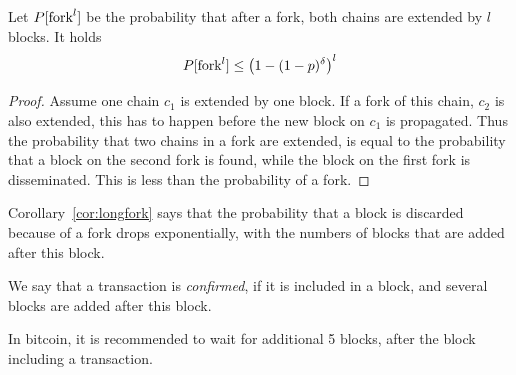 \begin{cor}
\label{cor:longfork}
Let $P[\textnormal{fork}^l]$ be the probability that after a fork, both chains are extended by $l$ blocks. It holds
	\[
		P[\textnormal{fork}^l] \leq \left(1-(1-p)^\delta\right)^l
	\]
	
\end{cor}
\begin{proof}
Assume one chain $c_1$ is extended by one block. If a fork of this chain, $c_2$ is also extended, this has to happen before the new block on $c_1$ is propagated. Thus the probability that two chains in a fork are extended, is equal to the probability that a block on the second fork is found, while the block on the first fork is disseminated. This is less than the probability of a fork.
\end{proof}

Corollary~\ref{cor:longfork} says that the probability that a block is discarded because of a fork drops exponentially, with the numbers of blocks that are added after this block.

\begin{definition} We say that a transaction is \emph{confirmed}, if it is included in a block, and several blocks are added after this block.
	
In bitcoin, it is recommended to wait for additional 5 blocks, after the block including a transaction.	
\end{definition}

	